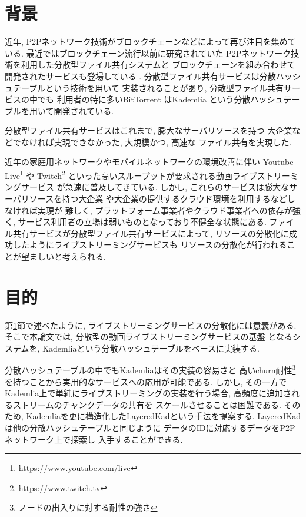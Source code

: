 \documentclass[sotsuron]{jcsie}
\begin{document}
\section{背景}
\label{sec:haikei}
近年, P2Pネットワーク技術がブロックチェーンなどによって再び注目を集めている.
最近ではブロックチェーン流行以前に研究されていた
P2Pネットワーク技術を利用した分散型ファイル共有システムと
ブロックチェーンを組み合わせて開発されたサービスも登場している
\cite{BitTorre1:online}.
分散型ファイル共有サービスは分散ハッシュテーブルという技術を用いて
実装されることがあり, 分散型ファイル共有サービスの中でも
利用者の特に多いBitTorrent\cite{BitTorre59:online}
はKademlia\cite{maymounkov2002kademlia}\cite{高野祐輝2010nat}
という分散ハッシュテーブルを用いて開発されている.

分散型ファイル共有サービスはこれまで, 膨大なサーバリソースを持つ
大企業などでなければ実現できなかった, 大規模かつ, 高速な
ファイル共有を実現した.

近年の家庭用ネットワークやモバイルネットワークの環境改善に伴い
Youtube Live\footnote{https://www.youtube.com/live} や 
Twitch\footnote{https://www.twitch.tv} 
といった高いスループットが要求される動画ライブストリーミングサービス
が急速に普及してきている.
しかし, これらのサービスは膨大なサーバリソースを持つ大企業
や大企業の提供するクラウド環境を利用するなどしなければ実現が
難しく,  プラットフォーム事業者やクラウド事業者への依存が強く, 
サービス利用者の立場は弱いものとなっており不健全な状態にある.
ファイル共有サービスが分散型ファイル共有サービスによって, 
リソースの分散化に成功したようにライブストリーミングサービスも
リソースの分散化が行われることが望ましいと考えられる.

\section{目的}
第\ref{sec:haikei}節で述べたように, 
ライブストリーミングサービスの分散化には意義がある.
そこで本論文では, 分散型の動画ライブストリーミングサービスの基盤
となるシステムを, Kademliaという分散ハッシュテーブルをベースに実装する.

分散ハッシュテーブルの中でもKademliaはその実装の容易さと
高いchurn耐性\footnote{ノードの出入りに対する耐性の強さ}
を持つことから実用的なサービスへの応用が可能である.
しかし, その一方でKademlia上で単純にライブストリーミングの実装を行う場合, 
高頻度に追加されるストリームのチャンクデータの共有を
スケールさせることは困難である.
そのため, Kademliaを更に構造化したLayeredKadという手法を提案する.
LayeredKadは他の分散ハッシュテーブルと同じように
データのIDに対応するデータをP2Pネットワーク上で探索し
入手することができる.
\end{document}
